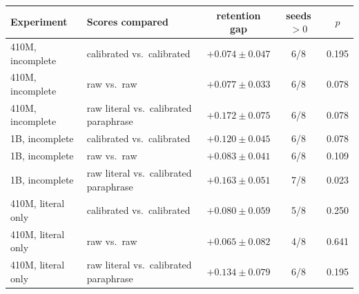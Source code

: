 \begin{tabular}{llccc}
\toprule
Experiment & Scores compared & retention gap & seeds $>0$ & $p$ \\
\midrule
410M, incomplete & calibrated vs.\ calibrated & $+0.074\pm0.047$ & 6/8 & 0.195 \\
410M, incomplete & raw vs.\ raw & $+0.077\pm0.033$ & 6/8 & 0.078 \\
410M, incomplete & raw literal vs.\ calibrated paraphrase & $+0.172\pm0.075$ & 6/8 & 0.078 \\
\addlinespace
1B, incomplete & calibrated vs.\ calibrated & $+0.120\pm0.045$ & 6/8 & 0.078 \\
1B, incomplete & raw vs.\ raw & $+0.083\pm0.041$ & 6/8 & 0.109 \\
1B, incomplete & raw literal vs.\ calibrated paraphrase & $+0.163\pm0.051$ & 7/8 & 0.023 \\
\addlinespace
410M, literal only & calibrated vs.\ calibrated & $+0.080\pm0.059$ & 5/8 & 0.250 \\
410M, literal only & raw vs.\ raw & $+0.065\pm0.082$ & 4/8 & 0.641 \\
410M, literal only & raw literal vs.\ calibrated paraphrase & $+0.134\pm0.079$ & 6/8 & 0.195 \\
\bottomrule
\end{tabular}
